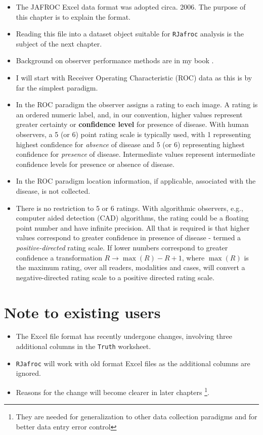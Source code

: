 \documentclass[
]{book}
\providecommand{\tightlist}{%
  \setlength{\itemsep}{0pt}\setlength{\parskip}{0pt}}
\begin{document}
\begin{itemize}
\tightlist
\item
  The JAFROC Excel data format was adopted circa. 2006. The purpose of this chapter is to explain the format.
\item
  Reading this file into a dataset object suitable for \texttt{RJafroc} analysis is the subject of the next chapter.
\item
  Background on observer performance methods are in my book \citep{chakraborty2017observer}.
\item
  I will start with Receiver Operating Characteristic (ROC) data \citep{metz1978rocmethodology} as this is by far the simplest paradigm.
\item
  In the ROC paradigm the observer assigns a rating to each image. A rating is an ordered numeric label, and, in our convention, higher values represent greater certainty or \textbf{confidence level} for presence of disease. With human observers, a 5 (or 6) point rating scale is typically used, with 1 representing highest confidence for \emph{absence} of disease and 5 (or 6) representing highest confidence for \emph{presence} of disease. Intermediate values represent intermediate confidence levels for presence or absence of disease.
\item
  In the ROC paradigm location information, if applicable, associated with the disease, is not collected.
\item
  There is no restriction to 5 or 6 ratings. With algorithmic observers, e.g., computer aided detection (CAD) algorithms, the rating could be a floating point number and have infinite precision. All that is required is that higher values correspond to greater confidence in presence of disease - termed a \emph{positive-directed} rating scale. If lower numbers correspond to greater confidence a transformation \(R \rightarrow \max(R) - R + 1\), where \(\max(R)\) is the maximum rating, over all readers, modalities and cases, will convert a negative-directed rating scale to a positive directed rating scale.
\end{itemize}

\hypertarget{quick-start-data-format-note-to-existing-users}{%
\section{Note to existing users}\label{quick-start-data-format-note-to-existing-users}}

\begin{itemize}
\tightlist
\item
  The Excel file format has recently undergone changes, involving three additional columns in the \texttt{Truth} worksheet.
\item
  \texttt{RJafroc} will work with old format Excel files as the additional columns are ignored.
\item
  Reasons for the change will become clearer in later chapters \footnote{They are needed for generalization to other data collection paradigms and for better data entry error control}.
\end{itemize}
\end{document}
